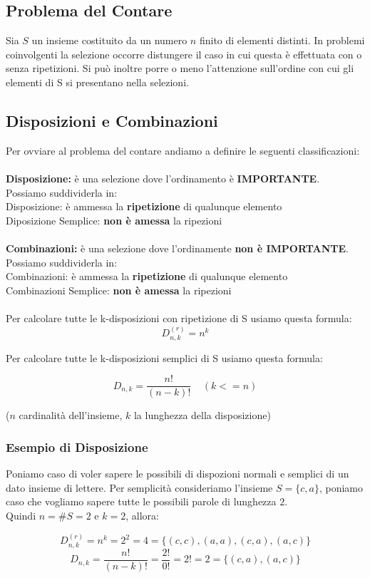 \subsection{Problema del Contare}
Sia $S$ un insieme costituito da un numero $n$ finito di elementi distinti. In problemi coinvolgenti la selezione occorre distungere il caso in cui questa è effettuata con o senza ripetizioni. Si può inoltre porre o meno l'attenzione sull'ordine con cui gli elementi di S si presentano nella selezioni.

\subsection{Disposizioni e Combinazioni}
Per ovviare al problema del contare andiamo a definire le seguenti classificazioni:\\\\
\textbf{Disposizione:} è una selezione dove l'ordinamento è \textbf{IMPORTANTE}.\\
Possiamo suddividerla in:\\
Disposizione: è ammessa la \textbf{ripetizione} di qualunque elemento\\
Diposizione Semplice: \textbf{non è amessa} la ripezioni\\\\
\textbf{Combinazioni: } è una selezione dove l'ordinamente \textbf{non è IMPORTANTE}.\\
Possiamo suddividerla in:\\
Combinazioni: è ammessa la \textbf{ripetizione} di qualunque elemento\\
Combinazioni Semplice: \textbf{non è amessa} la ripezioni\\\\

Per calcolare tutte le k-disposizioni con ripetizione di S usiamo questa formula:
$$ D^{(r)}_{n,k} = n^k$$ 

Per calcolare tutte le k-disposizioni semplici di S usiamo questa formula:

$$ D_{n,k} = \frac{n!}{(n-k)!} \: \: \: \: \: (k<=n)$$ 

\begin{center}
($n$ cardinalità dell'insieme, $k$ la lunghezza della disposizione)
\end{center}

\subsubsection{Esempio di Disposizione}
Poniamo caso di voler sapere le possibili di dispozioni normali e semplici di un dato insieme di lettere.
Per semplicità consideriamo l'insieme $S=\{c,a\}$, poniamo caso che vogliamo sapere tutte le possibili parole di lunghezza $2$.\\
Quindi $n = \#S = 2$ e $k = 2$, allora:

$$ D^{(r)}_{n,k} = n^k = 2^2 = 4 = \{(c,c),(a,a),(c,a),(a,c)\} $$
$$ D_{n,k} = \frac{n!}{(n-k)!} = \frac{2!}{0!} = 2! = 2 = \{(c,a), (a,c)\}$$ 


















